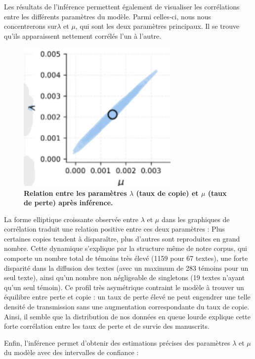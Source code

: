 \documentclass[a4paper,twoside,12pt]{book}
\begin{document}
Les résultats de l’inférence permettent également de visualiser les corrélations entre les différents paramètres du modèle. Parmi celles-ci, nous nous concentrerons sur$\lambda$ et $\mu$, qui sont les deux paramètres principaux. Il se trouve qu'ils apparaissent nettement corrélés l’un à l’autre.

\begin{figure}[H]
	\centering
	\includegraphics[width=0.7\textwidth]{img/correlationlm.png}
	\caption{\textbf{Relation entre les paramètres $\lambda$ (taux de copie) et $\mu$ (taux de perte) après inférence.}}
	\label{fig:fig_simus}
\end{figure}

La forme elliptique croissante observée entre $\lambda$ et $\mu$ dans les graphiques de corrélation traduit une relation positive entre ces deux paramètres : Plus certaines copies tendent à disparaître, plus d’autres sont reproduites en grand nombre. Cette dynamique s’explique par la structure même de notre corpus, qui comporte un nombre total de témoins très élevé (1159 pour 67 textes), une forte disparité dans la diffusion des textes (avec un maximum de 283 témoins pour un seul texte), ainsi qu’un nombre non négligeable de singletons (19 textes n’ayant qu’un seul témoin). Ce profil très asymétrique contraint le modèle à trouver un équilibre entre perte et copie : un taux de perte élevé ne peut engendrer une telle densité de transmission sans une augmentation correspondante du taux de copie. Ainsi, il semble que la distribution de nos données en queue lourde explique cette forte corrélation entre les taux de perte et de survie des manuscrits.

Enfin, l'inférence permet d'obtenir des estimations précises des paramètres $\lambda$ et $\mu$ du modèle avec des intervalles de confiance :
\end{document}

